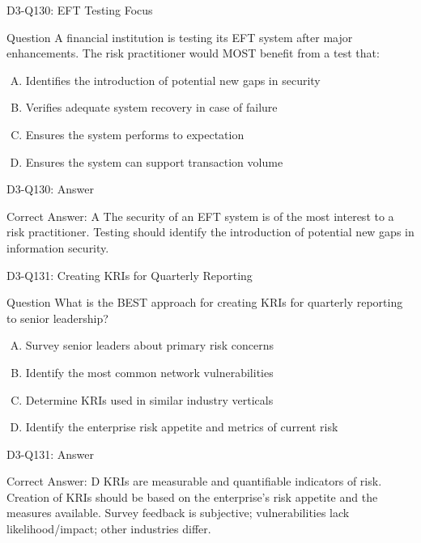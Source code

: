 \documentclass{beamer}
\begin{document}
	\begin{frame}{D3-Q130: EFT Testing Focus}
		\begin{block}{Question}
			A financial institution is testing its EFT system after major enhancements. The risk practitioner would MOST benefit from a test that:
		\end{block}
		\begin{enumerate}[(A)]
			\item Identifies the introduction of potential new gaps in security
			\item Verifies adequate system recovery in case of failure
			\item Ensures the system performs to expectation
			\item Ensures the system can support transaction volume
		\end{enumerate}
	\end{frame}
	\begin{frame}{D3-Q130: Answer}
		\begin{block}{Correct Answer: A}
			The security of an EFT system is of the most interest to a risk practitioner. Testing should identify the introduction of potential new gaps in information security.
		\end{block}
	\end{frame}
	
	\begin{frame}{D3-Q131: Creating KRIs for Quarterly Reporting}
		\begin{block}{Question}
			What is the BEST approach for creating KRIs for quarterly reporting to senior leadership?
		\end{block}
		\begin{enumerate}[(A)]
			\item Survey senior leaders about primary risk concerns
			\item Identify the most common network vulnerabilities
			\item Determine KRIs used in similar industry verticals
			\item Identify the enterprise risk appetite and metrics of current risk
		\end{enumerate}
	\end{frame}
	\begin{frame}{D3-Q131: Answer}
		\begin{block}{Correct Answer: D}
			KRIs are measurable and quantifiable indicators of risk. Creation of KRIs should be based on the enterprise's risk appetite and the measures available. Survey feedback is subjective; vulnerabilities lack likelihood/impact; other industries differ.
		\end{block}
	\end{frame}
	
\end{document}
